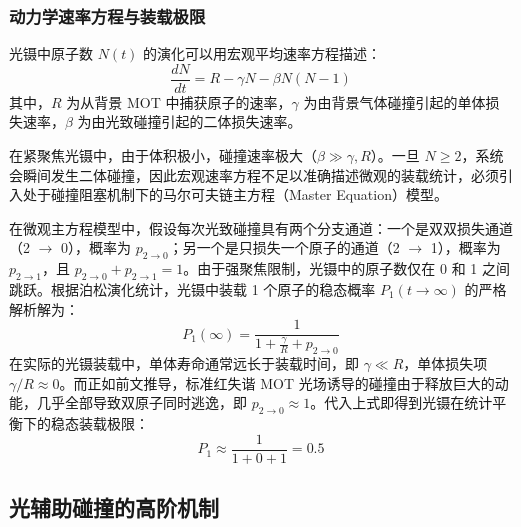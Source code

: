 \documentclass[../main.tex]{subfiles}
\begin{document}
\subsubsection{动力学速率方程与装载极限}

光镊中原子数 $N(t)$ 的演化可以用宏观平均速率方程描述：
\begin{equation}
\frac{dN}{dt} = R - \gamma N - \beta N(N-1)
\end{equation}
其中，$R$ 为从背景 MOT 中捕获原子的速率，$\gamma$ 为由背景气体碰撞引起的单体损失速率，$\beta$ 为由光致碰撞引起的二体损失速率。

在紧聚焦光镊中，由于体积极小，碰撞速率极大（$\beta \gg \gamma, R$）。一旦 $N \ge 2$，系统会瞬间发生二体碰撞，因此宏观速率方程不足以准确描述微观的装载统计，必须引入处于碰撞阻塞机制下的马尔可夫链主方程（Master Equation）模型。

在微观主方程模型中，假设每次光致碰撞具有两个分支通道：一个是双双损失通道（2 $\to$ 0），概率为 $p_{2 \to 0}$；另一个是只损失一个原子的通道（2 $\to$ 1），概率为 $p_{2 \to 1}$，且 $p_{2 \to 0} + p_{2 \to 1} = 1$。由于强聚焦限制，光镊中的原子数仅在 0 和 1 之间跳跃。根据泊松演化统计，光镊中装载 1 个原子的稳态概率 $P_1(t \to \infty)$ 的严格解析解为：
\begin{equation}
P_1(\infty) = \frac{1}{1 + \frac{\gamma}{R} + p_{2 \to 0}}
\end{equation}
在实际的光镊装载中，单体寿命通常远长于装载时间，即 $\gamma \ll R$，单体损失项 $\gamma/R \approx 0$。而正如前文推导，标准红失谐 MOT 光场诱导的碰撞由于释放巨大的动能，几乎全部导致双原子同时逃逸，即 $p_{2 \to 0} \approx 1$。代入上式即得到光镊在统计平衡下的稳态装载极限：
\begin{equation}
P_1 \approx \frac{1}{1 + 0 + 1} = 0.5
\end{equation}

\subsection{光辅助碰撞的高阶机制}
\label{ch2:sec:advanced_collisions}
\end{document}
